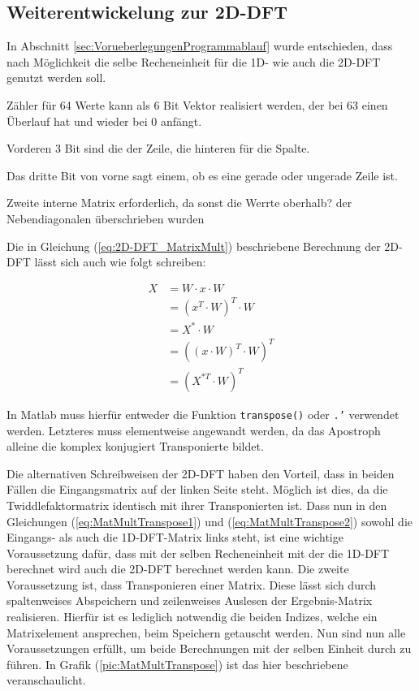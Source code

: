 \subsection{Weiterentwickelung zur 2D-DFT}
In Abschnitt \ref{sec:VorueberlegungenProgrammablauf} wurde entschieden, dass nach Möglichkeit die selbe Recheneinheit
für die 1D- wie auch die 2D-DFT genutzt werden soll. 

Zähler für 64 Werte kann als 6 Bit Vektor realisiert werden, der bei 63 einen Überlauf hat und wieder bei 0 anfängt.

Vorderen 3 Bit sind die der Zeile, die hinteren für die Spalte.

Das dritte Bit von vorne sagt einem, ob es eine gerade oder ungerade Zeile ist.

Zweite interne Matrix erforderlich, da sonst die Werrte oberhalb? der
Nebendiagonalen  überschrieben wurden
 
 
 
Die in Gleichung (\ref{eq:2D-DFT_MatrixMult}) beschriebene Berechnung der 2D-DFT lässt sich auch wie folgt schreiben:

\begin{align}
 X &= W \cdot x \cdot W \nonumber \\
   &= \left(x^T\cdot W\right)^T\cdot W \label{eq:MatMultTranspose1} \\
   &= X^* \cdot W \nonumber\\
   &= \left(\left(x\cdot W\right)^T\cdot W\right)^T \label{eq:MatMultTranspose2}\\
   &= \left(X^{*T} \cdot W\right)^T \nonumber
\end{align}

In Matlab muss hierfür entweder die Funktion \texttt{transpose()} oder \texttt{.'} verwendet werden. Letzteres muss elementweise angewandt werden, da das Apostroph
alleine die komplex konjugiert Transponierte bildet.

Die alternativen Schreibweisen der 2D-DFT haben den Vorteil, dass in beiden Fällen die Eingangsmatrix auf der linken Seite steht. Möglich ist dies, da die 
Twiddlefaktormatrix identisch mit ihrer Transponierten ist.
Dass nun in den Gleichungen (\ref{eq:MatMultTranspose1}) und (\ref{eq:MatMultTranspose2}) sowohl die Eingangs- als auch die 1D-DFT-Matrix links steht, ist eine wichtige 
Voraussetzung dafür, dass mit der selben Recheneinheit mit der die 1D-DFT berechnet wird auch die 2D-DFT berechnet werden kann.
Die zweite Voraussetzung ist, dass  Transponieren einer Matrix. Diese lässt sich durch spaltenweises Abspeichern und zeilenweises Auslesen der Ergebnis-Matrix realisieren.
Hierfür ist es lediglich notwendig die beiden Indizes, welche ein Matrixelement ansprechen, beim Speichern getauscht werden. Nun sind nun alle Voraussetzungen erfüllt, 
um beide Berechnungen mit der selben Einheit durch zu führen. In Grafik (\ref{pic:MatMultTranspose}) ist das hier beschriebene veranschaulicht.

